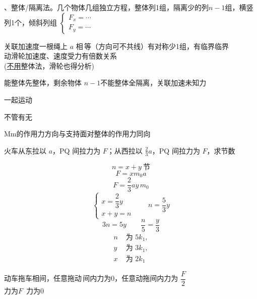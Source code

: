 、整体/隔离法。几个物体几组独立方程，整体列1组，隔离少的列$n-1$组，横竖列1个，倾斜列组 \quad $\begin{cases}F_x=\cdots\\ F_y=\cdots\end{cases}$

\medskip
\noindent 关联加速度\quad 一根绳上 $a$ 相\,等（方向可不共线）\qquad 有对称少1组，有临界临界 \\
动滑轮加速度、速度受力有倍数关系 \\
(\underline{不用}整体法，滑轮也得分析)

\noindent 能整体先整体，剩余物体 $n-1$\quad 不能整体全隔离，关联加速未知力

一起运动


不管有无\unclear{$\mu$}


Mm的作用力方向与支持面对整体的作用力同向 %

\begin{problem}[2、]
火车从东拉以 $a$，PQ 间拉力为 $F$；从西拉以 $\frac23a$，PQ 间拉力为 $F$，求节数
\begin{solution}
\[ n=x+y\ \text{节} \]
\[ F=xm_0a \]
\[ F=\frac23ay\,m_0 \]
\[ \begin{cases} x=\dfrac23y\\ x+y=n\end{cases}\qquad n=\frac53y \]
\[ 3n=5y\qquad \frac n5=\frac y3 \]
\[ \begin{aligned} n&\text{ 为 }5k_1,\\ y&\text{ 为 }3k_1,\\ x&\text{ 为 }2k_1\end{aligned} \]
\end{solution}
\end{problem}

\noindent 动车拖车相间，任意拖动\,间内力为0，任意动拖间内力为 $\dfrac F2$ \\
力为$F$\ 力为0

